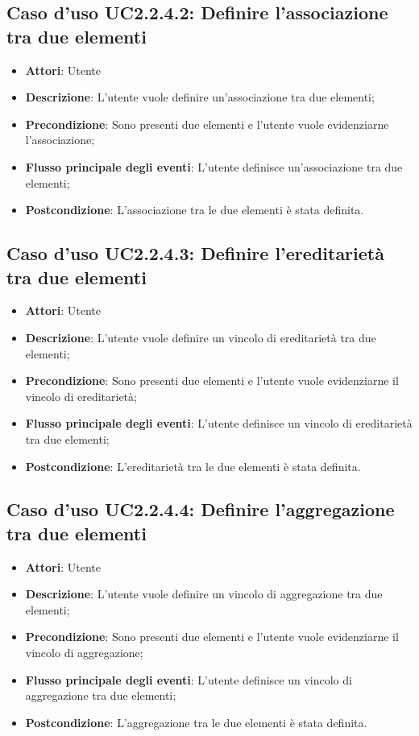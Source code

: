 \documentclass[../AnalisiDeiRequisiti.tex]{subfiles}
\begin{document}
			\subsection{Caso d'uso UC2.2.4.2: Definire l'associazione tra due elementi}
			\begin{itemize}
				\item \textbf{Attori}: Utente
				\item \textbf{Descrizione}: L'utente vuole definire un'associazione tra due elementi;
				\item \textbf{Precondizione}: Sono presenti due elementi e l'utente vuole evidenziarne l'associazione;
				\item \textbf{Flusso principale degli eventi}: L'utente definisce un'associazione tra due elementi;
				\item \textbf{Postcondizione}: L'associazione tra le due elementi è stata definita.
			\end{itemize}
			\subsection{Caso d'uso UC2.2.4.3: Definire l'ereditarietà tra due elementi}
			\begin{itemize}
				\item \textbf{Attori}: Utente
				\item \textbf{Descrizione}: L'utente vuole definire un vincolo di ereditarietà tra due elementi;
				\item \textbf{Precondizione}: Sono presenti due elementi e l'utente vuole evidenziarne il vincolo di ereditarietà;
				\item \textbf{Flusso principale degli eventi}: L'utente definisce un vincolo di ereditarietà tra due elementi;
				\item \textbf{Postcondizione}: L'ereditarietà tra le due elementi è stata definita.
			\end{itemize}
			\subsection{Caso d'uso UC2.2.4.4: Definire l'aggregazione tra due elementi}
			\begin{itemize}
				\item \textbf{Attori}: Utente
				\item \textbf{Descrizione}: L'utente vuole definire un vincolo di aggregazione tra due elementi;
				\item \textbf{Precondizione}: Sono presenti due elementi e l'utente vuole evidenziarne il vincolo di aggregazione;
				\item \textbf{Flusso principale degli eventi}: L'utente definisce un vincolo di aggregazione tra due elementi;
				\item \textbf{Postcondizione}: L'aggregazione tra le due elementi è stata definita.
			\end{itemize}
\end{document}
